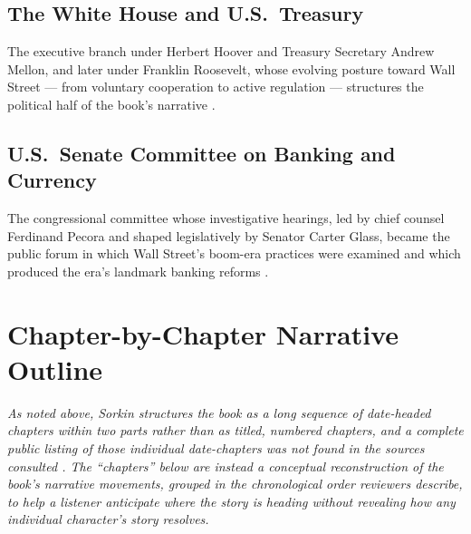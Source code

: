 \documentclass[11pt]{article}
\begin{document}
\subsection{The White House and U.S.\ Treasury}
The executive branch under Herbert Hoover and Treasury Secretary Andrew Mellon, and
later under Franklin Roosevelt, whose evolving posture toward Wall Street --- from
voluntary cooperation to active regulation --- structures the political half of the
book's narrative \autocite{supersummary1929,csmonitor1929}.

\subsection{U.S.\ Senate Committee on Banking and Currency}
The congressional committee whose investigative hearings, led by chief counsel
Ferdinand Pecora and shaped legislatively by Senator Carter Glass, became the public
forum in which Wall Street's boom-era practices were examined and which produced the
era's landmark banking reforms \autocite{libraryjournal1929,dailyeconomy1929}.

\section{Chapter-by-Chapter Narrative Outline}

\emph{As noted above, Sorkin structures the book as a long sequence of date-headed
chapters within two parts rather than as titled, numbered chapters, and a complete
public listing of those individual date-chapters was not found in the sources
consulted \autocite{wikipedia1929book}. The ``chapters'' below are instead a
conceptual reconstruction of the book's narrative movements, grouped in the
chronological order reviewers describe, to help a listener anticipate where the
story is heading without revealing how any individual character's story resolves.}
\end{document}
